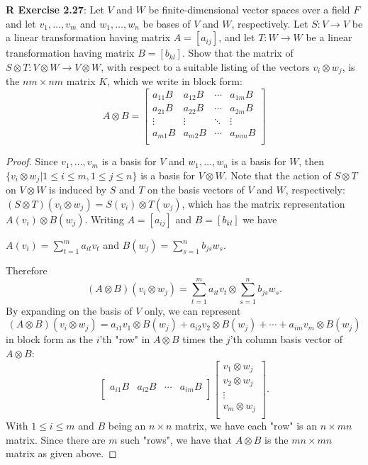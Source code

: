 \documentclass[8pt]{amsart}
\theoremstyle{plain}%
\theoremstyle{definition}
\theoremstyle{remark}
\numberwithin{equation}{section}
\begin{document}
\textbf{R Exercise 2.27}: Let $V$ and $W$ be finite-dimensional vector spaces over a field $F$ and let $v_1, \dots , v_m$ and $w_1, \dots , w_n$ be bases of $V$ and $W$, respectively. Let $S:V\rightarrow V$ be a linear transformation having matrix $A=[a_{ij}]$, and let $T:W\rightarrow W$ be a linear transformation having matrix $B=[b_{kl}]$. Show that the matrix of $S\otimes T: V\otimes W\rightarrow V\otimes W$, with respect to a suitable listing of the vectors $v_i\otimes w_j$, is the $nm \times nm$ matrix $K$, which we write in block form: $$A\otimes B=\begin{bmatrix}
a_{11} B & a_{12} B & \cdots & a_{1m} B\\
a_{21} B & a_{22} B & \cdots & a_{2m} B\\
\vdots & \vdots & \ddots & \vdots \\
a_{m1} B & a_{m2} B & \cdots & a_{mm} B\\
\end{bmatrix} $$
	\begin{proof}
	Since $v_1, \dots , v_m$ is a basis for $V$ and $w_1, \dots , w_n$ is a basis for $W$, then $\{v_i\otimes w_j|1\leq i\leq m, 1\leq j\leq n\}$ is a basis for $V\otimes W$. Note that the action of $S\otimes T$ on $V\otimes W$ is induced by $S$ and $T$ on the basis vectors of $V$ and $W$, respectively: \\
	
$(S\otimes T) (v_i\otimes w_j)=S(v_i)\otimes T(w_j)$, which has the matrix representation $A(v_i)\otimes B(w_j)$. Writing $A=[a_{ij}]$ and $B=[b_{kl}]$ we have 
\begin{center}
$A(v_i)=\sum_{t=1}^ma_{it}v_t$ and $B(w_j)=\sum_{s=1}^nb_{js}w_s$.
\end{center}
Therefore $$(A\otimes B)(v_i\otimes w_j)=\sum_{t=1}^ma_{it}v_t\otimes \sum_{s=1}^nb_{js}w_s.$$ By expanding on the basis of $V$ only, we can represent $$(A\otimes B)(v_i\otimes w_j)=a_{i1}v_1\otimes B(w_j) + a_{i2}v_2\otimes B(w_j) + \cdots + a_{im}v_m\otimes B(w_j)$$ in block form as the $i$'th "row" in $A\otimes B$ times the $j$'th column basis vector of $A\otimes B$: $$\begin{bmatrix}
a_{i1} B & a_{i2} B & \cdots & a_{im} B\\
\end{bmatrix} 
\begin{bmatrix}
v_1\otimes w_j\\
v_2\otimes w_j\\
\vdots\\
v_m\otimes w_j\\
\end{bmatrix}.$$ With $1\leq i\leq m$ and $B$ being an $n\times n$ matrix, we have each "row" is an $n\times mn$ matrix. Since there are $m$ such "rows", we have that $A\otimes B$ is the $mn\times mn$ matrix as given above.
	\end{proof}
\end{document}
